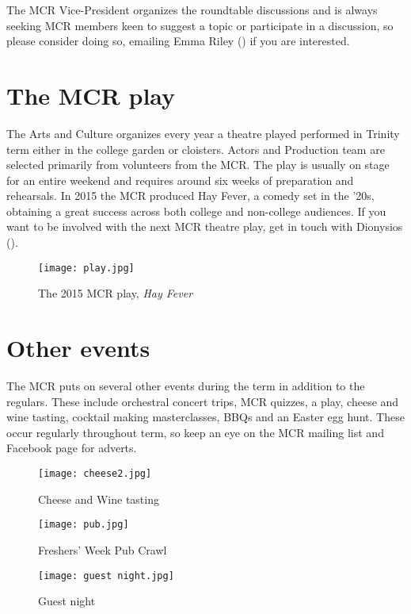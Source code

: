 The MCR Vice-President organizes the roundtable discussions and is always seeking MCR members
keen to suggest a topic or participate in a discussion, so please consider doing so, emailing Emma Riley
(\href{mailto:emma.riley@new.ox.ac.uk}{})
if you are interested.


\section{The MCR play}
The Arts and Culture organizes every year a theatre played performed in Trinity
term either in the college garden or cloisters. Actors and Production team are
selected primarily from volunteers from the MCR. The play is usually on stage for an entire weekend and requires around six weeks of preparation and rehearsals. In 2015 the MCR produced Hay Fever, a comedy set in the '20s, obtaining a great success across both college and non-college audiences. If you want to be involved with the next MCR theatre play, get in touch with Dionysios (\href{mailto:dionysios.kyropoulos@music.ox.ac.uk}{}).

\begin{figure}[htbp]
\centering
\texttt{[image: play.jpg]}
\caption[]{The 2015 MCR play,
\emph{Hay Fever}}
\label{fig:play}
\end{figure}

\section{Other events}
The MCR puts on several other events during the term in addition to the regulars. These include orchestral concert trips, MCR quizzes, a play, cheese and wine tasting, cocktail making masterclasses, BBQs and an Easter egg hunt. These occur regularly throughout term, so keep an eye on the MCR mailing list and Facebook page for adverts.


\begin{figure}[htbp]
\centering
		\begin{minipage}{0.3\textwidth}
                \texttt{[image: cheese2.jpg]}
                \caption[]{Cheese and Wine tasting}
                \label{fig:cheese}
        \end{minipage}%
        \quad
        \begin{minipage}{0.3\textwidth}
                \texttt{[image: pub.jpg]}
                \caption[]{Freshers' Week Pub Crawl}
                \label{fig:crawl}
        \end{minipage}%
        \quad
        \begin{minipage}{0.30\textwidth}      
                \texttt{[image: guest night.jpg]}
                \caption[]{Guest night}
                \label{fig:narnia}
        \end{minipage}%
\end{figure}